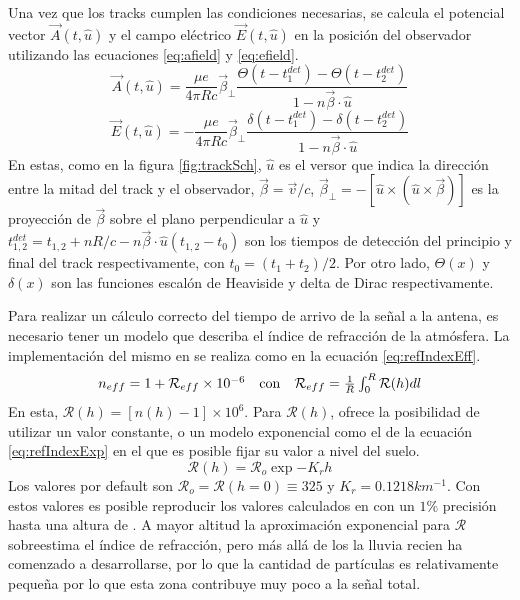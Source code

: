 	Una vez que los tracks cumplen las condiciones necesarias, se calcula el potencial vector $\vec{A}(t,\hat{u})$ y el campo el\'ectrico $\vec{E}(t,\hat{u})$ en la posici\'on del observador utilizando las ecuaciones \ref{eq:afield} y \ref{eq:efield}.
	\begin{equation}
	\vec{A}(t,\hat{u})
	=
	\frac{\mu e}{4\pi Rc}
	\vec\beta_{\bot}
	\frac{\Theta(t-t^{det}_1)-\Theta(t-t^{det}_2)}{1-n\vec\beta\cdot\hat u}
	\label{eq:afield}
	\end{equation}
	\begin{equation}
	\vec{E}(t,\hat{u})
	=
	-\frac{\mu e}{4\pi Rc}
	\vec\beta_{\bot}
	\frac{\delta(t-t^{det}_1)-\delta(t-t^{det}_2)}{1-n\vec\beta\cdot\hat u}
	\label{eq:efield}
	\end{equation}
	En estas, como en la figura \ref{fig:trackSch}, $\hat{u}$ es el versor que indica la direcci\'on entre la mitad del track y el observador, $\vec\beta=\vec v/c$, $\vec\beta_{\bot}=-[\hat{u}\times(\hat{u}\times\vec\beta)]$ es la proyecci\'on de $\vec\beta$ sobre el plano perpendicular a $\hat u$ y $t_{1,2}^{det}=t_{1,2}+nR/c-n\vec\beta \cdot \hat u (t_{1,2}-t_0)$ son los tiempos de detecci\'on del principio y final del track respectivamente, con $t_0=(t_1+t_2)/2$. Por otro lado, $\Theta(x)$ y $\delta(x)$ son las funciones escalón de Heaviside y delta de Dirac respectivamente.
	
	Para realizar un c\'alculo correcto del tiempo de arrivo de la se\~nal a la antena, es necesario tener un modelo que describa el \'indice de refracci\'on de la atm\'osfera.
	La implementación del mismo en \zhs{} se realiza como en la ecuaci\'on \ref{eq:refIndexEff}.
	\begin{equation}
		\begin{matrix}
		n_{eff}
		=
		1+{\mathcal R}_{eff}\times10^{-6}
		&
		{\rm con}
		&
		{\mathcal R}_{eff}
		=
		\frac{1}{R}\int_0^R{\mathcal R}(h)dl
		\end{matrix}
	\label{eq:refIndexEff}
	\end{equation}
	En esta, ${\mathcal R}(h) = \left[ n(h)-1 \right] \times 10^6$.
	Para ${\mathcal R}(h)$, \zhs{} ofrece la posibilidad de utilizar un valor constante, o un modelo exponencial como el de la ecuaci\'on \ref{eq:refIndexExp} en el que es posible fijar su valor a nivel del suelo.
	\begin{equation}
	{\mathcal R}(h)
	=
	{\mathcal R}_o
	\exp{-K_rh}
	\label{eq:refIndexExp}
	\end{equation}
	Los valores por default son ${\mathcal R}_o={\mathcal R}(h=0)\equiv 325$ y $K_r=0.1218km^{-1}$.
	Con estos valores es posible reproducir los valores calculados en \cite{gerson1948polar} con un $1\%$ precisi\'on hasta una altura de .
	A mayor altitud la aproximaci\'on exponencial para ${\mathcal R}$ sobreestima el \'indice de refracci\'on, pero m\'as all\'a de los  la lluvia recien ha comenzado a desarrollarse, por lo que la cantidad de part\'iculas es relativamente peque\~na por lo que esta zona contribuye muy poco a la se\~nal total.
	
